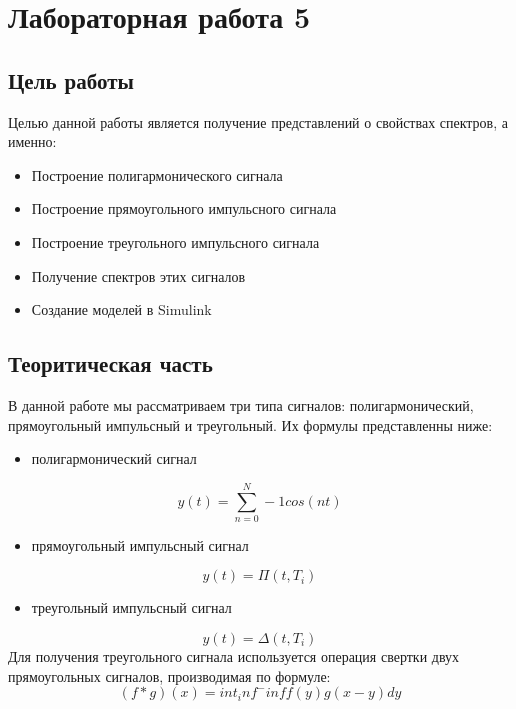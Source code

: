 \documentclass[10pt,a4paper]{report}
\begin{document}
\chapter{Лабораторная работа 5}
\section{Цель работы}
Целью данной работы является получение представлений о свойствах спектров, а именно:
\begin{itemize}
\item Построение полигармонического сигнала
\item Построение прямоугольного импульсного сигнала
\item Построение треугольного импульсного сигнала
\item Получение спектров этих сигналов
\item Создание моделей в Simulink
\end{itemize}
\section{Теоритическая часть}
В данной работе мы рассматриваем три типа сигналов: полигармонический, прямоугольный импульсный и треугольный. Их формулы представленны ниже:
\begin{itemize}
\item полигармонический сигнал 
\end{itemize}
\begin{displaymath}
y(t) = \sum_{n=0}^N-1 cos(nt)
\end{displaymath}
\begin{itemize}
\item прямоугольный импульсный сигнал
\end{itemize}
\begin{displaymath}
y(t) = \Pi (t,T_i)
\end{displaymath}
\begin{itemize}
\item треугольный импульсный сигнал
\end{itemize}
\begin{displaymath}
y(t) = \Delta (t,T_i)
\end{displaymath}
Для получения треугольного сигнала используется операция свертки двух прямоугольных сигналов, производимая по формуле:
\begin{displaymath}
(f*g)(x) = int_inf^-inf f(y)g(x-y)dy
\end{displaymath}
\end{document}
